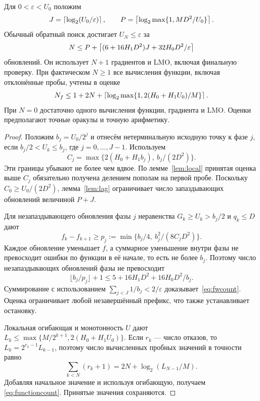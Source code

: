 \begin{theorem}\label{thm:fw}
Для $0<\varepsilon<U_0$ положим
\[
 J=\left\lceil\log_2(U_0/\varepsilon)\right\rceil,\qquad
 P=\left\lceil\log_2\max\{1,MD^2/U_0\}\right\rceil.
\]
Обычный обратный поиск достигает $U_N\le\varepsilon$ за
\begin{equation}\label{eq:fwcount}
 N\le P+\left\lceil(6+16H_1D^2)J+32H_0D^2/\varepsilon\right\rceil
\end{equation}
обновлений. Он использует $N+1$ градиентов и LMO, включая финальную
проверку. При фактическом $N\ge1$ все вычисления функции, включая
отклонённые пробы, учтены в оценке
\begin{equation}\label{eq:functioncount}
 N_f\le1+2N+\left\lceil\log_2\max\{1,2(H_0+H_1U_0)/M\}\right\rceil.
\end{equation}
При $N=0$ достаточно одного вычисления функции, градиента и LMO.
Оценки предполагают точные оракулы и точную арифметику.
\end{theorem}
\begin{proof}
Положим $b_j=U_0/2^j$ и отнесём нетерминальную исходную точку
к фазе $j$, если $b_j/2<U_k\le b_j$, где $j=0,\ldots,J-1$.
Используем
\[
 C_j=\max\{2(H_0+H_1b_j),\ b_j/(2D^2)\}.
\]
Эти границы убывают не более чем вдвое. По лемме~\ref{lem:local}
принятая оценка выше $C_j$ обязательно получена делением пополам
на первой пробе. Поскольку $C_0\ge U_0/(2D^2)$, лемма~\ref{lem:lag}
ограничивает число запаздывающих обновлений величиной $P+J$.

Для незапаздывающего обновления фазы $j$ неравенства
$G_k\ge U_k>b_j/2$ и $q_k\le D$ дают
\[
 f_k-f_{k+1}\ge p_j:=\min\{b_j/4,\ b_j^2/(8C_jD^2)\}.
\]
Каждое обновление уменьшает $f$, а суммарное уменьшение внутри фазы
не превосходит ошибки по функции в её начале, то есть не более $b_j$.
Поэтому число незапаздывающих обновлений фазы не превосходит
\[
 \lfloor b_j/p_j\rfloor+1
 \le5+16H_1D^2+16H_0D^2/b_j.
\]
Суммирование с использованием $\sum_{j<J}1/b_j<2/\varepsilon$
доказывает~\eqref{eq:fwcount}. Оценка ограничивает любой
незавершённый префикс, что также устанавливает остановку.

Локальная огибающая и монотонность $U$ дают
$L_k\le\max\{M/2^{k+1},2(H_0+H_1U_0)\}$.
Если $r_k$ — число отказов, то $L_k=2^{r_k-1}L_{k-1}$, поэтому
число вычисленных пробных значений в точности равно
\[
 \sum_{k<N}(r_k+1)=2N+\log_2(L_{N-1}/M).
\]
Добавляя начальное значение и используя огибающую, получаем
\eqref{eq:functioncount}. Принятые значения сохраняются.
\end{proof}

